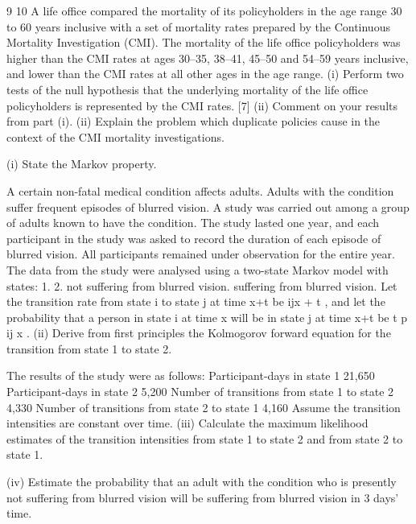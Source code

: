 9
10
A life office compared the mortality of its policyholders in the age range 30 to 60
years inclusive with a set of mortality rates prepared by the Continuous Mortality
Investigation (CMI). The mortality of the life office policyholders was higher than
the CMI rates at ages 30–35, 38–41, 45–50 and 54–59 years inclusive, and lower than
the CMI rates at all other ages in the age range.
(i) Perform two tests of the null hypothesis that the underlying mortality of the
life office policyholders is represented by the CMI rates.
[7]
(ii) Comment on your results from part (i).
(ii) Explain the problem which duplicate policies cause in the context of the CMI
mortality investigations.

(i) State the Markov property.


A certain non-fatal medical condition affects adults. Adults with the condition suffer
frequent episodes of blurred vision. A study was carried out among a group of adults
known to have the condition. The study lasted one year, and each participant in the
study was asked to record the duration of each episode of blurred vision. All
participants remained under observation for the entire year.
The data from the study were analysed using a two-state Markov model with states:
1.
2.
not suffering from blurred vision.
suffering from blurred vision.
Let the transition rate from state i to state j at time x+t be \mu ijx + t , and let the probability
that a person in state i at time x will be in state j at time x+t be t p ij x .
(ii)
Derive from first principles the Kolmogorov forward equation for the
transition from state 1 to state 2.

The results of the study were as follows:
Participant-days in state 1
21,650
Participant-days in state 2
5,200
Number of transitions from state 1 to state 2 4,330
Number of transitions from state 2 to state 1 4,160
Assume the transition intensities are constant over time.
(iii) Calculate the maximum likelihood estimates of the transition intensities from
state 1 to state 2 and from state 2 to state 1.

(iv) Estimate the probability that an adult with the condition who is presently not
suffering from blurred vision will be suffering from blurred vision in 3 days’
time.


\newpage


